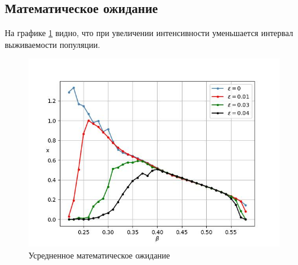 \subsection{Математическое ожидание}

    На графике \ref{EV_cyclic} видно, что при увеличении интенсивности уменьшается интервал выживаемости популяции.
        
    \begin{figure}
        \centering
        \includegraphics[width=\textwidth]{stochastic/images/EV_cyclic.jpg}
        
        \captionsetup{justification=centering}
        \caption{Усредненное математическое ожидание}
        \label{EV_cyclic}
    \end{figure}
